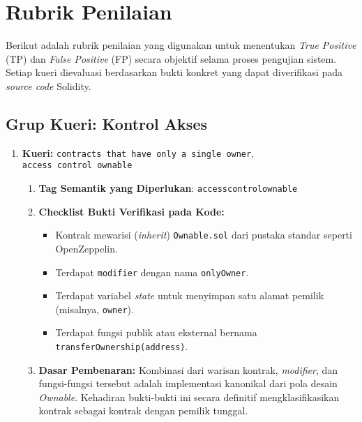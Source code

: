 \chapter{Rubrik Penilaian}
\label{appendix:rubrik-penilaian}

Berikut adalah rubrik penilaian yang digunakan untuk menentukan \textit{True Positive} (TP) dan \textit{False Positive} (FP) secara objektif selama proses pengujian sistem. Setiap kueri dievaluasi berdasarkan bukti konkret yang dapat diverifikasi pada \textit{source code} Solidity.

\section{Grup Kueri: Kontrol Akses}
\begin{enumerate}
	\item \textbf{Kueri:} \texttt{contracts that have only a single owner}, \\\texttt{access control ownable}
	      \begin{enumerate}
		      \item \textbf{Tag Semantik yang Diperlukan}: \texttt{access\textunderscore control\textunderscore ownable}
		      \item \textbf{Checklist Bukti Verifikasi pada Kode:}
		            \begin{itemize}
			            \item Kontrak mewarisi (\textit{inherit}) \texttt{Ownable.sol} dari pustaka standar seperti OpenZeppelin.
			            \item Terdapat \texttt{modifier} dengan nama \texttt{onlyOwner}.
			            \item Terdapat variabel \textit{state} untuk menyimpan satu alamat pemilik (misalnya, \texttt{\textunderscore owner}).
			            \item Terdapat fungsi publik atau eksternal bernama \\\texttt{transferOwnership(address)}.
		            \end{itemize}
		      \item \textbf{Dasar Pembenaran:} Kombinasi dari warisan kontrak, \textit{modifier}, dan fungsi-fungsi tersebut adalah implementasi kanonikal dari pola desain \textit{Ownable}. Kehadiran bukti-bukti ini secara definitif mengklasifikasikan kontrak sebagai kontrak dengan pemilik tunggal.
	      \end{enumerate}
\end{enumerate}


